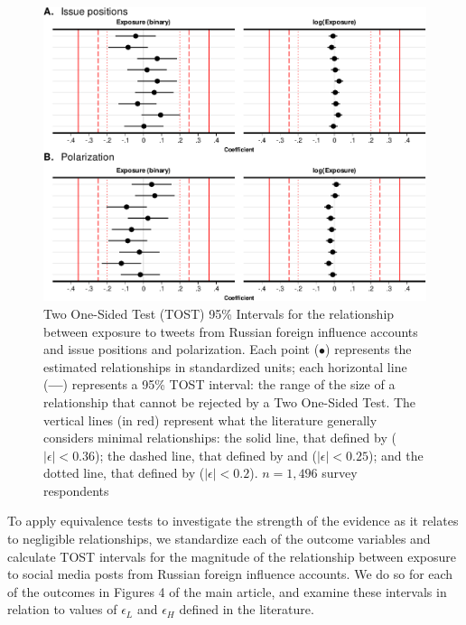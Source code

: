 \documentclass[
  12pt,
]{article}
\begin{document}
\begin{figure}
\centering
\includegraphics{Appendix_files/figure-latex/Figure-B3-1.pdf}
\caption{\label{fig:Figure-B3}Two One-Sided Test (TOST) 95\% Intervals for the relationship between exposure to tweets from Russian foreign influence accounts and issue positions and polarization. Each point (\(\bullet\)) represents the estimated relationships in standardized units; each horizontal line (\textbf{---}) represents a 95\% TOST interval: the range of the size of a relationship that cannot be rejected by a Two One-Sided Test. The vertical lines (in red) represent what the literature generally considers minimal relationships: the solid line, that defined by \citet{Hartman2018} (\(|\epsilon| < 0.36\)); the dashed line, that defined by \citet{Ho2007} and \citet{Imbens2015} (\(|\epsilon| < 0.25\)); and the dotted line, that defined by \citet{Cohen1969} (\(|\epsilon| < 0.2\)). \(n = 1,496\) survey respondents}
\end{figure}

To apply equivalence tests to investigate the strength of the evidence as it relates to negligible relationships, we standardize each of the outcome variables and calculate TOST intervals for the magnitude of the relationship between exposure to social media posts from Russian foreign influence accounts. We do so for each of the outcomes in Figures 4 of the main article, and examine these intervals in relation to values of \(\epsilon_L\) and \(\epsilon_H\) defined in the literature.
\end{document}
